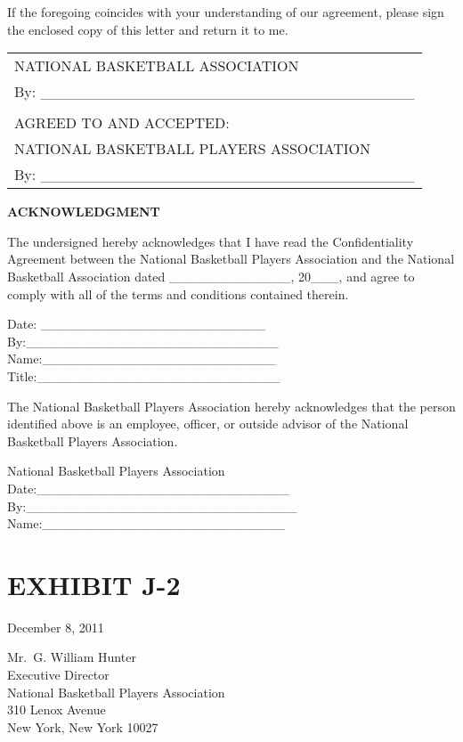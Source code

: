 \documentclass[
]{book}
\begin{document}
If the foregoing coincides with your understanding of our agreement, please sign the enclosed copy of this letter and return it to me.

\begin{longtable}[]{@{}l@{}}
\toprule()
\endhead
NATIONAL BASKETBALL ASSOCIATION \\
By: \_\_\_\_\_\_\_\_\_\_\_\_\_\_\_\_\_\_\_\_\_\_\_\_\_\_\_\_\_\_\_\_\_\_\_ \\
 \\
AGREED TO AND ACCEPTED: \\
NATIONAL BASKETBALL PLAYERS ASSOCIATION \\
By: \_\_\_\_\_\_\_\_\_\_\_\_\_\_\_\_\_\_\_\_\_\_\_\_\_\_\_\_\_\_\_\_\_\_\_ \\
\bottomrule()
\end{longtable}

\newpage

\textbf{ACKNOWLEDGMENT}

The undersigned hereby acknowledges that I have read the Confidentiality Agreement between the National Basketball Players Association and the National Basketball Association dated \_\_\_\_\_\_\_\_\_\_\_\_\_, 20\_\_\_, and agree to comply with all of the terms and conditions contained therein.

Date: \_\_\_\_\_\_\_\_\_\_\_\_\_\_\_\_\_\_\_\_\_\_\_\_
By:\_\_\_\_\_\_\_\_\_\_\_\_\_\_\_\_\_\_\_\_\_\_\_\_\_\_\_
Name:\_\_\_\_\_\_\_\_\_\_\_\_\_\_\_\_\_\_\_\_\_\_\_\_\_
Title:\_\_\_\_\_\_\_\_\_\_\_\_\_\_\_\_\_\_\_\_\_\_\_\_\_\_

The National Basketball Players Association hereby acknowledges that the person identified above is an employee, officer, or outside advisor of the National Basketball Players Association.

National Basketball Players Association
Date:\_\_\_\_\_\_\_\_\_\_\_\_\_\_\_\_\_\_\_\_\_\_\_\_\_\_\_
By:\_\_\_\_\_\_\_\_\_\_\_\_\_\_\_\_\_\_\_\_\_\_\_\_\_\_\_\_\_
Name:\_\_\_\_\_\_\_\_\_\_\_\_\_\_\_\_\_\_\_\_\_\_\_\_\_\_

\newpage

\hypertarget{exhibit-j-2}{%
\section{EXHIBIT J-2}\label{exhibit-j-2}}

December 8, 2011

Mr.~G. William Hunter\\
Executive Director\\
National Basketball Players Association\\
310 Lenox Avenue\\
New York, New York 10027
\end{document}
